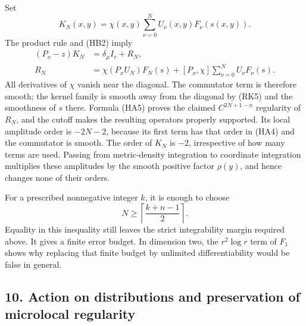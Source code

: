 \documentclass[
  11pt,
]{article}
\begin{document}
Set \[
        K_N(x,y)=\chi(x,y)\sum_{\nu=0}^NU_\nu(x,y)F_\nu(s(x,y)).
                                                               \tag{HA6}
\] The product rule and (HB2) imply \[
\begin{split}
 (P_x-z)K_N&=\delta_\mu I_r+R_N,\\
 R_N&=\chi(P_xU_N)F_N(s)
         +[P_x,\chi]\sum_{\nu=0}^NU_\nu F_\nu(s).
\end{split}                                                    \tag{HA7}
\] All derivatives of \(\chi\) vanish near the diagonal. The commutator
term is therefore smooth; the kernel family is smooth away from the
diagonal by (RK5) and the smoothness of \(s\) there. Formula (HA5)
proves the claimed \(C^{2N+1-n}\) regularity of \(R_N\), and the cutoff
makes the resulting operators properly supported. Its local amplitude
order is \(-2N-2\), because its first term has that order in (HA4) and
the commutator is smooth. The order of \(K_N\) is \(-2\), irrespective
of how many terms are used. Passing from metric-density integration to
coordinate integration multiplies these amplitudes by the smooth
positive factor \(\rho(y)\), and hence changes none of their orders.

For a prescribed nonnegative integer \(k\), it is enough to choose \[
                  N\geq\left\lceil\frac{k+n-1}{2}\right\rceil.
                                                               \tag{HA8}
\] Equality in this inequality still leaves the strict integrability
margin required above. It gives a finite error budget. In dimension two,
the \(r^2\log r\) term of \(F_1\) shows why replacing that finite budget
by unlimited differentiability would be false in general.

\subsection{10. Action on distributions and preservation of microlocal
regularity}\label{action-on-distributions-and-preservation-of-microlocal-regularity}
\end{document}
